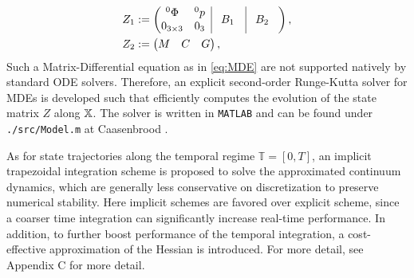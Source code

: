 %
\begin{align}
Z_1 & := \begin{pmatrix}
\begin{matrix}
^0 \Phi  & ^0 p \\ 0_{3\times3} &  0_{3}
\end{matrix} \;\; \vrule & \!B_1 & \vrule & \!B_2 \;\;\;
 \end{pmatrix}, \\
Z_2 & := \begin{pmatrix} M & C & G \end{pmatrix},
\end{align}
%
Such a Matrix-Differential equation as in \eqref{eq:MDE} are not supported natively by standard ODE solvers. Therefore, an explicit second-order Runge-Kutta solver for MDEs is developed such that efficiently computes the evolution of the state matrix $Z$ along $\mathbb{X}$. The solver is written in \texttt{MATLAB} and can be found under \texttt{./src/Model.m} at Caasenbrood \cite{Caasenbrood2020}.

As for state trajectories along the temporal regime $\mathbb{T} = [0,T]$, an implicit trapezoidal integration scheme is proposed to solve the approximated continuum dynamics, which are generally less conservative on discretization to preserve numerical stability. Here implicit schemes are favored over explicit scheme, since a coarser time integration can significantly increase real-time performance. In addition, to further boost performance of the temporal integration, a cost-effective approximation of the Hessian is introduced. For more detail, see Appendix C for more detail.
